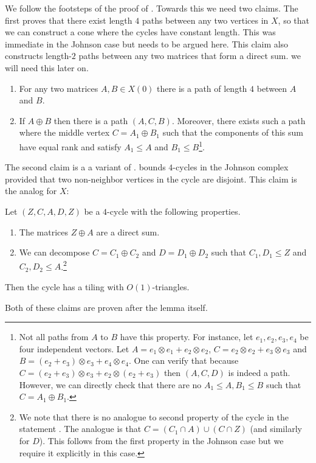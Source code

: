 We follow the footsteps of the proof of . Towards this we need two claims. The first proves that there exist length \(4\) paths between any two vertices in \(X\), so that we can construct a cone where the cycles have constant length. This was immediate in the Johnson case but needs to be argued here. This claim also constructs length-$2$ paths between any two matrices that form a direct sum. we will need this later on.
    \begin{claim} \label{claim:louis-link-const-diam}
        \begin{enumerate}
            \item For any two matrices \(A,B \in X(0)\) there is a path of length \(4\) between \(A\) and \(B\).
            \item If \(A \oplus B\) then there is a path \((A,C,B)\). Moreover, there exists such a path where the middle vertex \(C = A_1 \oplus B_1\) such that the components of this sum have equal rank and satisfy \(A_1 \leq A\) and \(B_1 \leq B\)\footnote{Not all paths from \(A\) to \(B\) have this property. For instance, let \(e_1,e_2,e_3,e_4\) be four independent vectors. Let \(A=e_1 \otimes e_1 + e_2 \otimes e_2\), \(C = e_2 \otimes e_2 + e_3 \otimes e_3\) and \(B=(e_2 + e_3) \otimes e_3 + e_4 \otimes e_4\). One can verify that because \(C = (e_2+e_3) \otimes e_3 + e_2 \otimes (e_2 + e_3)\) then \((A,C,D)\) is indeed a path. However, we can directly check that there are no \(A_1 \leq A, B_1 \leq B\) such that \(C=A_1 \oplus B_1\).}.
        \end{enumerate} 
    \end{claim}
The second claim is a a variant of .  bounds \(4\)-cycles in the Johnson complex provided that two non-neighbor vertices in the cycle are disjoint. This claim is the analog for \(X\):
\begin{claim} \label{claim:tiling-louis-special-cycles}
        Let \((Z,C,A,D,Z)\) be a \(4\)-cycle with the following properties.
    \begin{enumerate}
        \item The matrices \(Z \oplus A\) are a direct sum.
        \item We can decompose \(C=C_1 \oplus C_2\) and \(D=D_1 \oplus D_2\) such that \(C_1,D_1 \leq Z\) and \(C_2,D_2 \leq A\).\footnote{We note that there is no analogue to second property of the cycle in the statement . The analogue is that \(C= (C_1 \cap A) \cup (C \cap Z)\) (and similarly for \(D\)). This follows from the first property in the Johnson case but we require it explicitly in this case.}
    \end{enumerate}
    Then the cycle has a tiling with \(O(1)\)-triangles.
    \end{claim}
Both of these claims are proven after the lemma itself.

